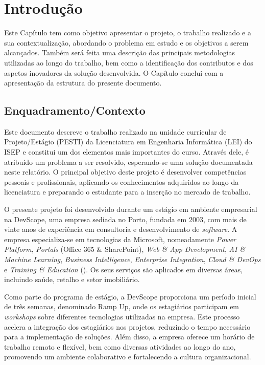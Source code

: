 \chapter{Introdução}
\label{chap:Intro}

Este Capítulo tem como objetivo apresentar o projeto, o trabalho realizado e a sua contextualização, abordando o problema em estudo e os objetivos a serem alcançados. Também será feita uma descrição das principais metodologias utilizadas ao longo do trabalho, bem como a identificação dos contributos e dos aspetos inovadores da solução desenvolvida. O Capítulo conclui com a apresentação da estrutura do presente documento.


\section{Enquadramento/Contexto} 
\label{sec:chap1_introduction} 

Este documento descreve o trabalho realizado na unidade curricular de Projeto/Estágio (PESTI) da Licenciatura em Engenharia Informática (LEI) do ISEP e constitui um dos elementos mais importantes do curso. Através dele, é atribuído um problema a ser resolvido, esperando-se uma solução documentada neste relatório. O principal objetivo deste projeto é desenvolver competências pessoais e profissionais, aplicando os conhecimentos adquiridos ao longo da licenciatura e preparando o estudante para a inserção no mercado de trabalho.

O presente projeto foi desenvolvido durante um estágio em ambiente empresarial na DevScope, uma empresa sediada no Porto, fundada em 2003, com mais de vinte anos de experiência em consultoria e desenvolvimento de \textit{software}. A empresa especializa-se em tecnologias da Microsoft, nomeadamente \textit{Power Platform}, \textit{Portals} (Office 365 \& SharePoint), \textit{Web \& App Development}, \textit{AI \& Machine Learning}, \textit{Business Intelligence}, \textit{Enterprise Integration}, \textit{Cloud \& DevOps} e \textit{Training \& Education} (\cite{DevScopeSolutions}). Os seus serviços são aplicados em diversas áreas, incluindo saúde, retalho e setor imobiliário.

Como parte do programa de estágio, a DevScope proporciona um período inicial de três semanas, denominado Ramp Up, onde os estagiários participam em \textit{workshops} sobre diferentes tecnologias utilizadas na empresa. Este processo acelera a integração dos estagiários nos projetos, reduzindo o tempo necessário para a implementação de soluções. Além disso, a empresa oferece um horário de trabalho remoto e flexível, bem como diversas atividades ao longo do ano, promovendo um ambiente colaborativo e fortalecendo a cultura organizacional.

